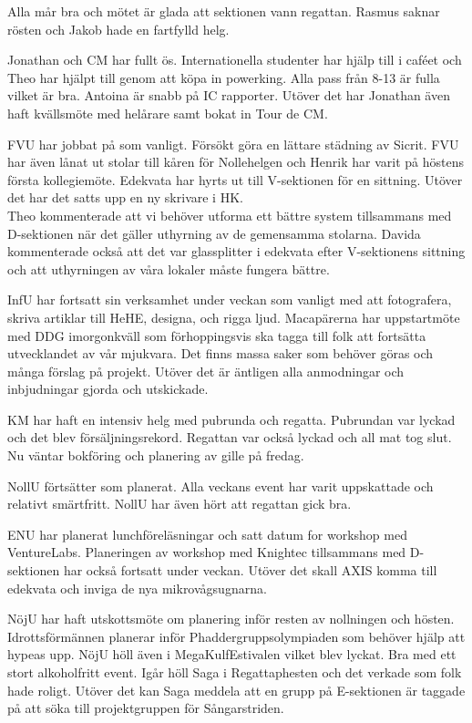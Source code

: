 \documentclass[10pt]{article}
\begin{document}
\begin{paragrafer}
\begin{paragrafer}

Alla mår bra och mötet är glada att sektionen vann regattan. 
Rasmus saknar rösten och Jakob hade en fartfylld helg.  




Jonathan och CM har fullt ös. 
Internationella studenter har hjälp till i caféet och Theo har hjälpt till genom att köpa in powerking. 
Alla pass från 8-13 är fulla vilket är bra. Antoina är snabb på IC rapporter. Utöver det har Jonathan även haft kvällsmöte med helårare samt bokat in Tour de CM. 


FVU har jobbat på som vanligt. Försökt göra en lättare städning av Sicrit. 
FVU har även lånat ut stolar till kåren för Nollehelgen och Henrik har varit på höstens första kollegiemöte. 
Edekvata har hyrts ut till V-sektionen för en sittning. Utöver det har det satts upp en ny skrivare i HK. 
\\ Theo kommenterade att vi behöver utforma ett bättre system tillsammans med D-sektionen när det gäller uthyrning av de gemensamma stolarna. Davida kommenterade också att det var glassplitter i edekvata efter V-sektionens sittning och att uthyrningen av våra lokaler måste fungera bättre. 


InfU har fortsatt sin verksamhet under veckan som vanligt med att fotografera, skriva artiklar till HeHE, designa, och rigga ljud. Macapärerna har uppstartmöte med DDG imorgonkväll som förhoppingsvis ska tagga till folk att fortsätta utvecklandet av vår mjukvara. Det finns massa saker som behöver göras och många förslag på projekt.
Utöver det är äntligen alla anmodningar och inbjudningar gjorda och utskickade. 


KM har haft en intensiv helg med pubrunda och regatta. Pubrundan var lyckad och det blev försäljningsrekord. Regattan var också lyckad och all mat tog slut. Nu väntar bokföring och planering av gille på fredag.


NollU förtsätter som planerat. Alla veckans event har varit uppskattade och relativt smärtfritt. NollU har även hört att regattan gick bra.  

ENU har planerat lunchföreläsningar och satt datum for workshop med VentureLabs. Planeringen av workshop med Knightec tillsammans med D-sektionen har också fortsatt under veckan. Utöver det skall AXIS komma till edekvata och inviga de nya mikrovågsugnarna.

NöjU har haft utskottsmöte om planering inför resten av nollningen och hösten. Idrottsförmännen planerar inför Phaddergruppsolympiaden som behöver hjälp att hypeas upp. NöjU höll även i MegaKulfEstivalen vilket blev lyckat. Bra med ett stort alkoholfritt event. Igår höll Saga i Regattaphesten och det verkade som folk hade roligt. 
Utöver det kan Saga meddela att en grupp på E-sektionen är taggade på att söka till projektgruppen för Sångarstriden. 


\end{paragrafer}
\end{paragrafer}
\end{document}

